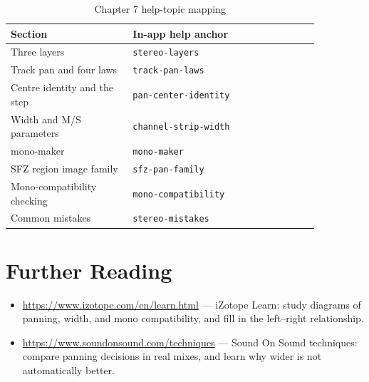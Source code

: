 \begin{table}[htbp]
\centering
\small
\begin{tabular}{@{}p{0.34\linewidth}p{0.52\linewidth}@{}}
\hline
Section & In-app help anchor \\
\hline
Three layers & \texttt{stereo-layers} \\
Track pan and four laws & \texttt{track-pan-laws} \\
Centre identity and the step & \texttt{pan-center-identity} \\
Width and M/S parameters & \texttt{channel-strip-width} \\
mono-maker & \texttt{mono-maker} \\
SFZ region image family & \texttt{sfz-pan-family} \\
Mono-compatibility checking & \texttt{mono-compatibility} \\
Common mistakes & \texttt{stereo-mistakes} \\
\hline
\end{tabular}
\caption{Chapter 7 help-topic mapping}
\label{tab:stereo-help-map}
\end{table}

\section*{Further Reading}
\begin{itemize}[leftmargin=1.5em]
\item \url{https://www.izotope.com/en/learn.html} — iZotope Learn: study diagrams of panning, width, and mono compatibility, and fill in the left–right relationship.
\item \url{https://www.soundonsound.com/techniques} — Sound On Sound techniques: compare panning decisions in real mixes, and learn why wider is not automatically better.
\end{itemize}
